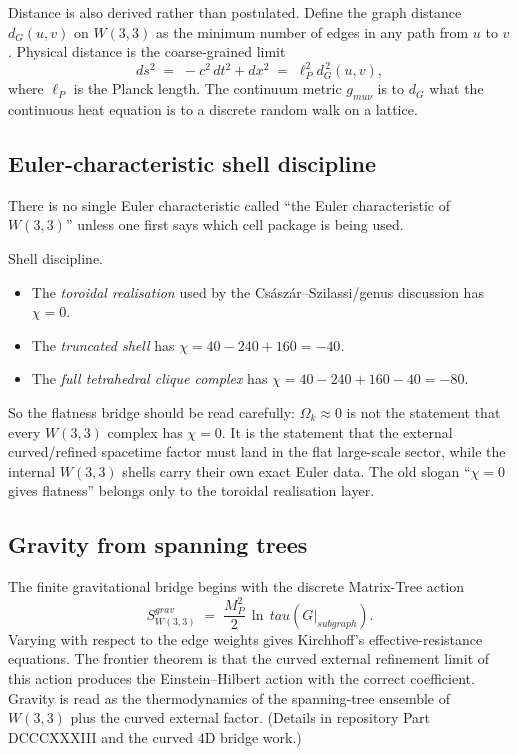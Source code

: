 \documentclass[11pt]{article}
\def\mathbf#1{#1}%
\def\textbf#1{#1}%
\def\text#1{#1}%
\def\mu{mu}%
\def\tau{tau}%
\def\cdot{ }%
\begin{document}
Distance is also derived rather than postulated. Define the graph distance $d_G(u,v)$ on $W(3,3)$ as the minimum number of edges in any path from $u$ to $v$. Physical distance is the coarse-grained limit
\[
ds^2 \;=\; -c^2\,dt^2 + d\mathbf{x}^2 \;=\; \ell_P^2 \cdot d_G^{\,2}(u,v),
\]
where $\ell_P$ is the Planck length. The continuum metric $g_{\mu\nu}$ is to $d_G$ what the continuous heat equation is to a discrete random walk on a lattice.

\subsection*{Euler-characteristic shell discipline}

There is no single Euler characteristic called ``the Euler characteristic of $W(3,3)$'' unless one first says which cell package is being used.

\begin{statusbox}
\textbf{Shell discipline.}
\begin{itemize}[leftmargin=2em]
\item The \emph{toroidal realisation} used by the Császár--Szilassi/genus discussion has $\chi=0$.
\item The \emph{truncated shell} has $\chi = 40 - 240 + 160 = -40$.
\item The \emph{full tetrahedral clique complex} has $\chi = 40 - 240 + 160 - 40 = -80$.
\end{itemize}
\end{statusbox}

So the flatness bridge should be read carefully: $\Omega_k \approx 0$ is not the statement that every $W(3,3)$ complex has $\chi=0$. It is the statement that the external curved/refined spacetime factor must land in the flat large-scale sector, while the internal $W(3,3)$ shells carry their own exact Euler data. The old slogan ``$\chi=0$ gives flatness'' belongs only to the toroidal realisation layer.

\subsection*{Gravity from spanning trees}

The finite gravitational bridge begins with the discrete Matrix-Tree action
\[
S_{W(3,3)}^{\text{grav}} \;=\; \frac{M_P^2}{2}\,\ln\,\tau(G\big|_{\text{subgraph}}).
\]
Varying with respect to the edge weights gives Kirchhoff's effective-resistance equations. The frontier theorem is that the curved external refinement limit of this action produces the Einstein--Hilbert action with the correct coefficient. \textbf{Gravity is read as the thermodynamics of the spanning-tree ensemble of $W(3,3)$ plus the curved external factor.} (Details in repository Part DCCCXXXIII and the curved $4$D bridge work.)
\end{document}

